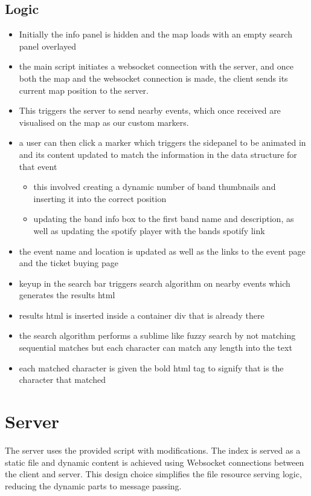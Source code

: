 \documentclass[10pt]{article}
\begin{document}
        \subsection{Logic}
            \begin{itemize}
                \item Initially the info panel is hidden and the map loads with an empty search panel overlayed
                \item the main script initiates a websocket connection with the server, and once both the map and the websocket connection is made, the client sends its current map position to the server.
                \item This triggers the server to send nearby events, which once received are visualised on the map as our custom markers.
                \item a user can then click a marker which triggers the sidepanel to be animated in and its content updated to match the information in the data structure for that event
                \begin{itemize}
                    \item this involved creating a dynamic number of band thumbnails and inserting it into the correct position
                    \item updating the band info box to the first band name and description, as well as updating the spotify player with the bands spotify link
                \end{itemize}
                \item the event name and location is updated as well as the links to the event page and the ticket buying page

                \item keyup in the search bar triggers search algorithm on nearby events which generates the results html
                \item results html is inserted inside a container div that is already there
                \item the search algorithm performs a sublime like fuzzy search by not matching sequential matches but each character can match any length into the text
                \item each matched character is given the bold html tag to signify that is the character that matched
            \end{itemize}

    \section{Server}
        The server uses the provided script with modifications. The index is served as a static file and dynamic content is achieved using Websocket connections between the client and server. This design choice simplifies the file resource serving logic, reducing the dynamic parts to message passing.
\end{document}
